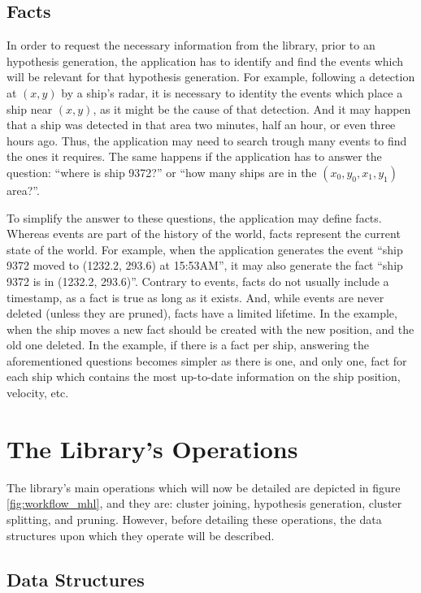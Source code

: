 \subsection{Facts}

In order to request the necessary information from the library, prior to an hypothesis generation, the application has to identify and find the events which will be relevant for that hypothesis generation. For example, following a detection at $(x,y)$ by a ship's radar, it is necessary to identity the events which place a ship near $(x,y)$, as it might be the cause of that detection. And it may happen that a ship was detected in that area two minutes, half an hour, or even three hours ago. Thus, the application may need to search trough many events to find the ones it requires. The same happens if the application has to answer the question: ``where is ship 9372?'' or ``how many ships are in the $(x_0, y_0, x_1, y_1)$ area?''.

To simplify the answer to these questions, the application may define facts. Whereas events are part of the history of the world, facts represent the current state of the world. For example, when the application generates the event ``ship 9372 moved to (1232.2, 293.6) at 15:53AM'', it may also generate the fact ``ship 9372 is in (1232.2, 293.6)''. Contrary to events, facts do not usually include a timestamp, as a fact is true as long as it exists. And, while events are never deleted (unless they are pruned), facts have a limited lifetime. In the example, when the ship moves a new fact should be created with the new position, and the old one deleted. In the example, if there is a fact per ship, answering the aforementioned questions becomes simpler as there is one, and only one, fact for each ship which contains the most up-to-date information on the ship position, velocity, etc.


\section{The Library's Operations}
\label{sec:library_operations}

The library's main operations which will now be detailed are depicted in figure \ref{fig:workflow_mhl}, and they are: cluster joining, hypothesis generation, cluster splitting, and pruning. However, before detailing these operations, the data structures upon which they operate will be described.

\subsection{Data Structures}
\label{sec:operations_detail}


